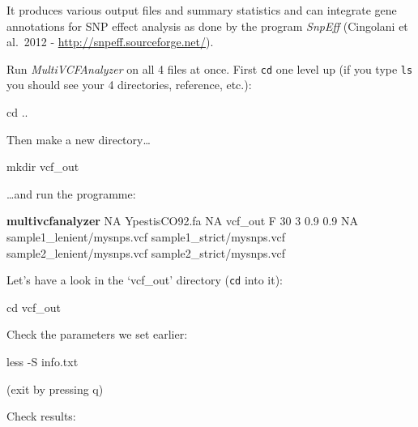 \documentclass[
  letterpaper,
]{book}
\newenvironment{Shaded}{}{}
\newcommand{\AttributeTok}[1]{\textcolor[rgb]{0.84,0.23,0.29}{#1}}
\newcommand{\BuiltInTok}[1]{\textcolor[rgb]{0.84,0.23,0.29}{#1}}
\newcommand{\ExtensionTok}[1]{\textcolor[rgb]{0.84,0.23,0.29}{\textbf{#1}}}
\newcommand{\FunctionTok}[1]{\textcolor[rgb]{0.44,0.26,0.76}{#1}}
\newcommand{\NormalTok}[1]{\textcolor[rgb]{0.14,0.16,0.18}{#1}}
\begin{document}
It produces various output files and summary statistics and can
integrate gene annotations for SNP effect analysis as done by the
program \emph{SnpEff} (Cingolani et al.~2012 -
\url{http://snpeff.sourceforge.net/}).

Run \emph{MultiVCFAnalyzer} on all 4 files at once. First \texttt{cd}
one level up (if you type \texttt{ls} you should see your 4 directories,
reference, etc.):

\begin{Shaded}
\begin{Highlighting}[]
\BuiltInTok{cd}\NormalTok{ ..}
\end{Highlighting}
\end{Shaded}

Then make a new directory\ldots{}

\begin{Shaded}
\begin{Highlighting}[]
\FunctionTok{mkdir}\NormalTok{ vcf\_out}
\end{Highlighting}
\end{Shaded}

\ldots and run the programme:

\begin{Shaded}
\begin{Highlighting}[]
\ExtensionTok{multivcfanalyzer}\NormalTok{ NA YpestisCO92.fa NA vcf\_out F 30 3 0.9 0.9 NA sample1\_lenient/mysnps.vcf sample1\_strict/mysnps.vcf sample2\_lenient/mysnps.vcf sample2\_strict/mysnps.vcf}
\end{Highlighting}
\end{Shaded}

Let's have a look in the `vcf\_out' directory (\texttt{cd} into it):

\begin{Shaded}
\begin{Highlighting}[]
\BuiltInTok{cd}\NormalTok{ vcf\_out}
\end{Highlighting}
\end{Shaded}

Check the parameters we set earlier:

\begin{Shaded}
\begin{Highlighting}[]
\FunctionTok{less} \AttributeTok{{-}S}\NormalTok{ info.txt}
\end{Highlighting}
\end{Shaded}

(exit by pressing q)

Check results:
\end{document}
